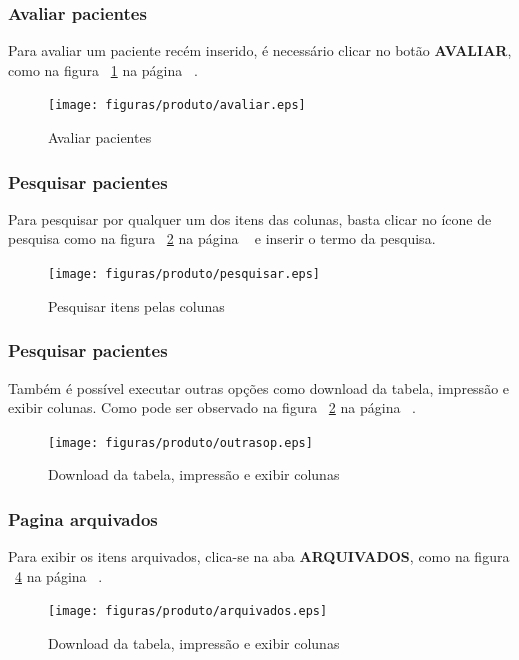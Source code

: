 \subsubsection{Avaliar pacientes}
Para avaliar um paciente recém inserido, é necessário clicar no botão \textbf{AVALIAR}, como na figura ~\ref{figavaliar} na página ~\pageref{figavaliar}.
\begin{figure}[!htb]
    \centering
    \texttt{[image: figuras/produto/avaliar.eps]}
    \caption{Avaliar pacientes}
    \label{figavaliar}
\end{figure}

\subsubsection{Pesquisar pacientes}
Para pesquisar por qualquer um dos itens das colunas, basta clicar no ícone de pesquisa como na figura ~\ref{figpesquisar} na página ~\pageref{figpesquisar} e inserir o termo da pesquisa.
\begin{figure}[!htb]
    \centering
    \texttt{[image: figuras/produto/pesquisar.eps]}
    \caption{Pesquisar itens pelas colunas}
    \label{figpesquisar}
\end{figure}

\subsubsection{Pesquisar pacientes}
Também é possível executar outras opções como download da tabela, impressão e exibir colunas. Como pode ser observado na figura ~\ref{figpesquisar} na página ~\pageref{figpesquisar}.
\begin{figure}[!htb]
    \centering
    \texttt{[image: figuras/produto/outrasop.eps]}
    \caption{Download da tabela, impressão e exibir colunas}
    \label{figoutrasop}
\end{figure}

\subsubsection{Pagina arquivados}
Para exibir os itens arquivados, clica-se na aba \textbf{ARQUIVADOS}, como na figura ~\ref{farquivados} na página ~\pageref{farquivados}.
\begin{figure}[!htb]
    \centering
    \texttt{[image: figuras/produto/arquivados.eps]}
    \caption{Download da tabela, impressão e exibir colunas}
    \label{farquivados}
\end{figure}


